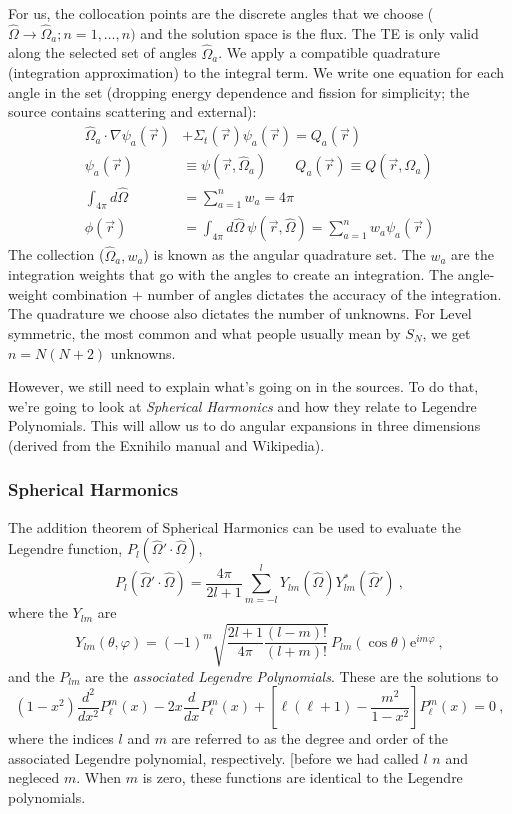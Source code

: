 \documentclass[12pt]{article}
\newcommand{\vecr}{\ensuremath{\vec{r}}}
\newcommand{\omvec}{\ensuremath{\hat{\Omega}}}
\newcommand{\vOmega}{\ensuremath{\hat{\Omega}}}
\begin{document}
For us, the collocation points are the discrete angles that we choose ($\omvec \rightarrow \omvec_a; n = 1,\dots,n)$ and the solution space is the flux. 
The TE is only valid along the selected set of angles $\vOmega_a$. We apply a compatible quadrature (integration approximation) to the integral term. We write one equation for each angle in the set (dropping energy dependence and fission for simplicity; the source contains scattering and external):
\begin{align*}
\vOmega_a \cdot \nabla \psi_a(\vecr) &+ \Sigma_t(\vecr)\psi_a(\vecr) = Q_a(\vec{r})\\
\psi_a(\vecr) &\equiv \psi(\vecr,\vOmega_a) \qquad Q_a(\vecr) \equiv Q(\vecr,\vOmega_a)\\
\int_{4\pi} d\vOmega\: &= \sum_{a=1}^n w_a = 4\pi \\
\phi(\vecr) &=  \int_{4\pi} d\vOmega\:\psi(\vecr,\vOmega) = \sum_{a=1}^n w_a \psi_a(\vecr)
\end{align*}
The collection ($\vOmega_a, w_a$) is known as the angular quadrature set. The $w_a$ are the integration weights that go with the angles to create an integration. The angle-weight combination + number of angles dictates the accuracy of the integration. The quadrature we choose also dictates the number of unknowns. For Level symmetric, the most common and what people usually mean by $S_{N}$, we get $n=N(N+2)$ unknowns. 

However, we still need to explain what's going on in the sources. To do that, we're going to look at \textit{Spherical Harmonics} and how they relate to Legendre Polynomials. This will allow us to do angular expansions in three dimensions (derived from the Exnihilo manual and Wikipedia). 

\subsubsection*{Spherical Harmonics}
The addition theorem of Spherical Harmonics can be used to evaluate the
Legendre function, $P_l(\vOmega'\cdot\vOmega)$,
\begin{equation}
  P_l(\vOmega'\cdot\vOmega) = \frac{4\pi}{2l+1}\sum_{m=-l}^l
  Y_{lm}(\vOmega)Y^{\ast}_{lm}(\vOmega')\:,
\end{equation}
where the $Y_{lm}$ are
\begin{equation}
  Y_{lm}(\theta,\varphi) = (-1)^m\sqrt
  {
    \frac{2l+1}{4\pi}\frac{(l-m)!}{(l+m)!}
  }\,
  P_{lm}(\cos\theta)\mathrm{e}^{im\varphi}\:,
  \label{eq:complete-spherical-harmonics}
\end{equation}
and the $P_{lm}$ are the \textit{associated Legendre Polynomials}. These are the solutions to
\[
(1-x^{2}){\frac {d^{2}}{dx^{2}}}P_{\ell }^{m}(x)-2x{\frac {d}{dx}}P_{\ell }^{m}(x)+\left[\ell (\ell +1)-{\frac {m^{2}}{1-x^{2}}}\right]P_{\ell }^{m}(x)=0\:,\]
where the indices $l$ and $m$ are referred to as the degree and order of the associated Legendre polynomial, respectively. [before we had called $l$ $n$ and negleced $m$. When $m$ is zero, these functions are identical to the Legendre polynomials.
\end{document}
